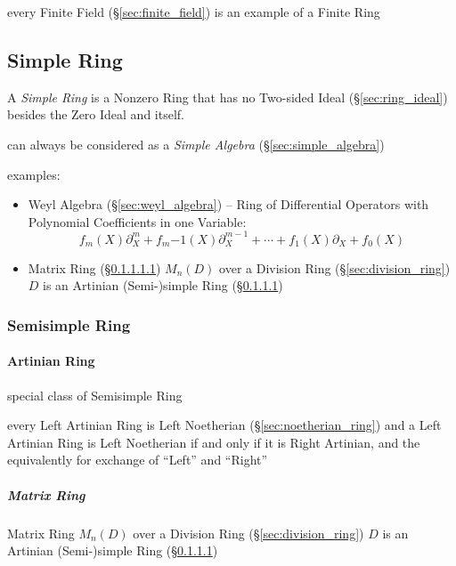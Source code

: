 every Finite Field (\S\ref{sec:finite_field}) is an example of a Finite Ring



\subsection{Simple Ring}\label{sec:simple_ring}

A \emph{Simple Ring} is a Nonzero Ring that has no Two-sided Ideal
(\S\ref{sec:ring_ideal}) besides the Zero Ideal and itself.

can always be considered as a \emph{Simple Algebra} (\S\ref{sec:simple_algebra})

examples:
\begin{itemize}
  \item Weyl Algebra (\S\ref{sec:weyl_algebra}) -- Ring of Differential
    Operators with Polynomial Coefficients in one Variable:\[
      f_m(X)\partial^m_X + f_m{-1}(X)\partial^{m-1}_X + \cdots +
      f_1(X)\partial_X + f_0(X)
    \]
  \item Matrix Ring (\S\ref{sec:matrix_ring}) $M_n(D)$ over a Division Ring
    (\S\ref{sec:division_ring}) $D$ is an Artinian (Semi-)simple Ring
    (\S\ref{sec:artinian_ring})
\end{itemize}



\subsubsection{Semisimple Ring}\label{sec:semisimple_ring}

\paragraph{Artinian Ring}\label{sec:artinian_ring}\hfill

special class of Semisimple Ring

every Left Artinian Ring is Left Noetherian (\S\ref{sec:noetherian_ring}) and a
Left Artinian Ring is Left Noetherian if and only if it is Right Artinian, and
the equivalently for exchange of ``Left'' and ``Right''



\subparagraph{Matrix Ring}\label{sec:matrix_ring}\hfill

Matrix Ring $M_n(D)$ over a Division Ring (\S\ref{sec:division_ring}) $D$ is an
Artinian (Semi-)simple Ring (\S\ref{sec:artinian_ring})



